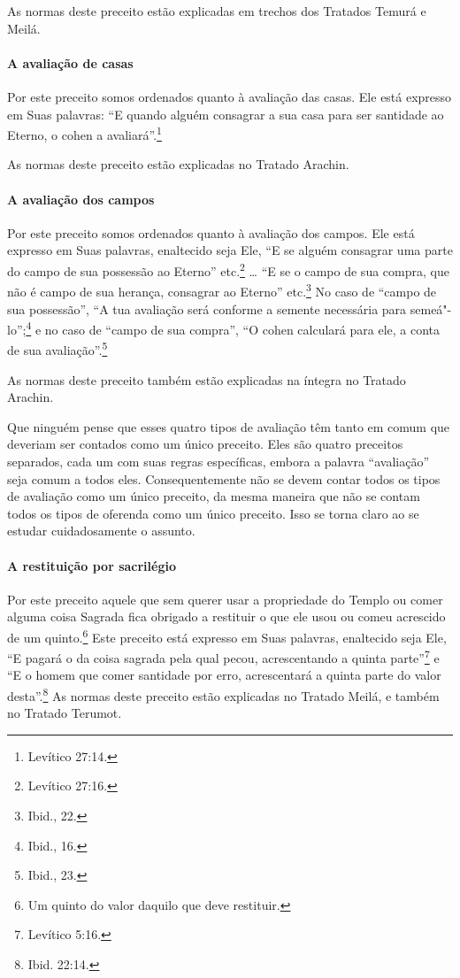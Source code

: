 \begin{multicols}{2}
As normas deste preceito estão explicadas em trechos dos Tratados Temurá\starr{}
e Meilá\starr.

\paragraph{A avaliação de casas}

Por este preceito somos ordenados quanto à avaliação das casas. Ele está
expresso em Suas palavras: ``E quando alguém consagrar a sua casa para
ser santidade ao Eterno, o cohen\starr{} a avaliará''.\footnote{Levítico 27:14.}

As normas deste preceito estão explicadas no Tratado Arachin\starr.

\paragraph{A avaliação dos campos}

Por este preceito somos ordenados quanto à avaliação dos campos. Ele
está expresso em Suas palavras, enaltecido seja Ele, ``E se alguém
consagrar uma parte do campo de sua possessão ao Eterno'' etc.\footnote{Levítico
27:16.} \ldots{} ``E se o campo de sua compra, que não é campo de sua herança,
consagrar ao Eterno'' etc.\footnote{Ibid., 22.} No caso de ``campo de sua
possessão'', ``A tua avaliação será conforme a semente necessária para
semeá"-lo'';\footnote{Ibid., 16.} e no caso de ``campo de sua compra'', ``O
cohen\starr{} calculará para ele, a conta de sua avaliação''.\footnote{Ibid., 23.}

As normas deste preceito também estão explicadas na íntegra no Tratado Arachin\starr.

Que ninguém pense que esses quatro tipos de avaliação têm tanto em comum
que deveriam ser contados como um único preceito. Eles são quatro
preceitos separados, cada um com suas regras específicas, embora a
palavra ``avaliação'' seja comum a todos eles. Consequentemente não se
devem contar todos os tipos de avaliação como um único preceito, da
mesma maneira que não se contam todos os tipos de oferenda como um único
preceito. Isso se torna claro ao se estudar cuidadosamente o assunto.

\paragraph{A restituição por sacrilégio}

Por este preceito aquele que sem querer usar a propriedade do Templo ou
comer alguma coisa Sagrada fica obrigado a restituir o que ele usou ou
comeu acrescido de um quinto.\footnote{Um quinto do valor daquilo que deve restituir.} Este preceito está
expresso em Suas palavras, enaltecido seja Ele, ``E pagará o da coisa
sagrada pela qual pecou, acrescentando a quinta parte''\footnote{Levítico 5:16.}
e ``E o homem que comer santidade por erro, acrescentará a quinta parte
do valor desta''.\footnote{Ibid. 22:14.} As normas deste preceito estão
explicadas no Tratado Meilá\starr, e também no Tratado Terumot\starr.


\end{multicols}
